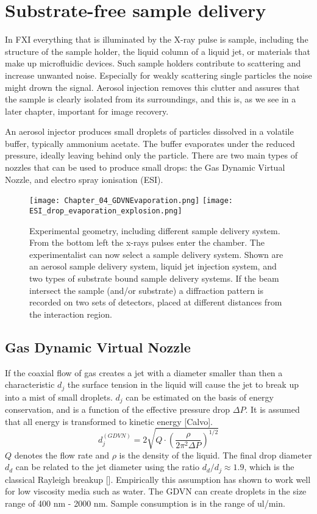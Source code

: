 \section{Substrate-free sample delivery}
In FXI everything that is illuminated by the X-ray pulse is sample, including the structure of the sample holder, the liquid column of a liquid jet, or materials that make up microfluidic devices. Such sample holders contribute to scattering and increase unwanted noise. Especially for weakly scattering single particles the noise might drown the signal. Aerosol injection removes this clutter and assures that the sample is clearly isolated from its surroundings, and this is, as we see in a later chapter, important for image recovery.

An aerosol injector produces small droplets of particles dissolved in a volatile buffer, typically ammonium acetate. The buffer evaporates under the reduced pressure, ideally leaving behind only the particle. There are two main types of nozzles that can be used to produce small drops: the Gas Dynamic Virtual Nozzle, and electro spray ionisation (ESI).

\begin{figure}[h]\label{fig:drop_formation}
\centering 
\texttt{[image: Chapter\_04\_GDVNEvaporation.png]}
\texttt{[image: ESI\_drop\_evaporation\_explosion.png]}

\caption{Experimental geometry, including different sample delivery system. From the bottom left the x-rays pulses enter the chamber. The experimentalist can now select a sample delivery system. Shown are an aerosol sample delivery system, liquid jet injection system, and two types of substrate bound sample delivery systems. If the beam intersect the sample (and/or substrate) a diffraction pattern is recorded on two sets of detectors, placed at different distances from the interaction region.}
\end{figure}




\subsection{Gas Dynamic Virtual Nozzle}

If the coaxial flow of gas creates a jet with a diameter smaller than then a characteristic $d_j$ the surface tension in the liquid will cause the jet to break up into a mist of small droplets. $d_j$ can be estimated on the basis of energy conservation, and is a function of the effective pressure drop $\Delta P$. It is assumed that all energy is transformed to kinetic energy [Calvo].
\begin{equation}
d_j^{(GDVN)} = 2 \sqrt{Q \cdot \left(\frac{\rho}{2 \pi^2 \Delta P}\right)^{1/2}}
\end{equation}    
$Q$ denotes the flow rate and $\rho$ is the density of the liquid. The final drop diameter $d_d$ can be related to the jet diameter using the ratio $d_d / d_j \approx 1.9$, which is the classical Rayleigh breakup []. Empirically this assumption has shown to work well for low viscosity media such as water. The GDVN can create droplets in the size range of 400 nm - 2000 nm. Sample consumption is in the range of ul/min.

